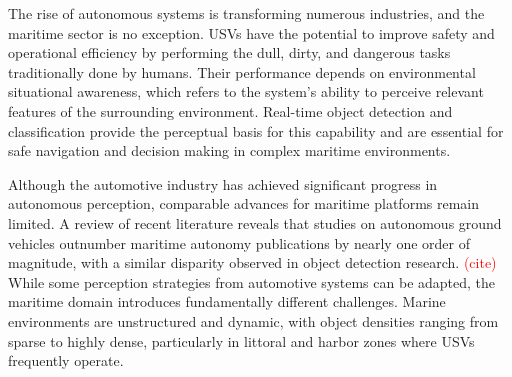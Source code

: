 The rise of autonomous systems is transforming numerous industries, and the maritime sector is no exception. \Acp{USV} have the potential to improve safety and operational efficiency by performing the dull, dirty, and dangerous tasks traditionally done by humans.
Their performance depends on environmental situational awareness, which refers to the system’s ability to perceive relevant features of the surrounding environment. 
Real-time object detection and classification provide the perceptual basis for this capability and are essential for safe navigation and decision making in complex maritime environments.

Although the automotive industry has achieved significant progress in autonomous perception, comparable advances for maritime platforms remain limited. 
A review of recent literature reveals that studies on autonomous ground vehicles outnumber maritime autonomy publications by nearly one order of magnitude, with a similar disparity observed in object detection research. \textcolor{red}{(cite)}
While some perception strategies from automotive systems can be adapted, the maritime domain introduces fundamentally different challenges. 
Marine environments are unstructured and dynamic, with object densities ranging from sparse to highly dense, particularly in littoral and harbor zones where \acp{USV} frequently operate.


